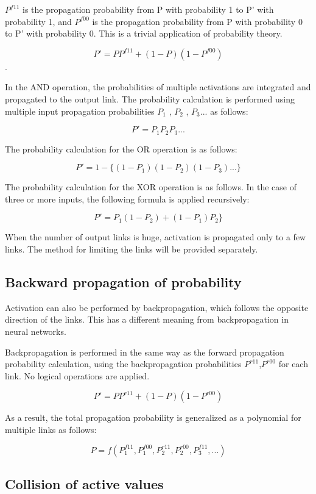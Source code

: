 \documentclass[12pt]{article}
\begin{document}
\(P^{f11}\) is the propagation probability from P with probability 1 to
P' with probability 1, and \(P^{f00}\) is the propagation probability
from P with probability 0 to P' with probability 0. This is a trivial
application of probability theory.

\[ P'=P P^{f11} +(1-P)(1-P^{f00})\].

In the AND operation, the probabilities of multiple activations are
integrated and propagated to the output link. The probability
calculation is performed using multiple input propagation probabilities
\(P_{1}\) , \(P_{2}\) , \(P_{3}...\) as follows:

\[ P'=P_{1} P_{2} P_{3}... \]

The probability calculation for the OR operation is as follows:

\[ P'=1-\{ (1-P_{1}) (1-P_{2}) (1-P_{3}) ... \} \]

The probability calculation for the XOR operation is as follows. In the
case of three or more inputs, the following formula is applied
recursively:

\[ P'= P_{1} (1-P_{2})+ (1-P_{1})P_{2} \} \]

When the number of output links is huge, activation is propagated only
to a few links. The method for limiting the links will be provided
separately.

\subsection{Backward propagation of probability}\label{backward-propagation-of-probability}

Activation can also be performed by backpropagation, which follows the
opposite direction of the links. This has a different meaning from
backpropagation in neural networks.

Backpropagation is performed in the same way as the forward propagation
probability calculation, using the backpropagation probabilities
\(P^{r11}\),\(P^{r00}\) for each link. No logical operations are
applied.

\[ P'=P P^{r11} +(1-P)(1-P^{r00}) \]

As a result, the total propagation probability is generalized as a
polynomial for multiple links as follows:

\[ P=f(P_1^{f11},P_1^{f00},P_2^{r11},P_2^{r00},P_3^{f11},... )\]

\subsection{Collision of active values}\label{collision-of-active-values}
\end{document}
